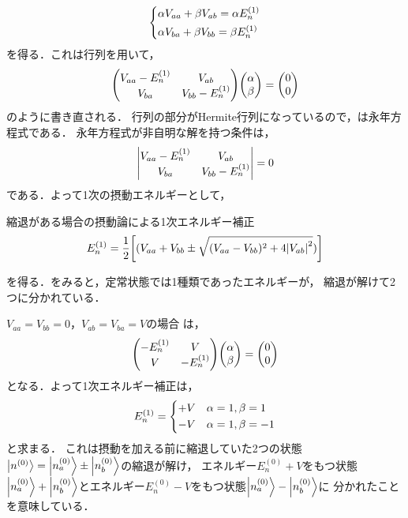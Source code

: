 \documentclass{report}
\begin{document}
  \begin{align}
    \begin{dcases}
      \alpha V_{aa} + \beta V_{ab} = \alpha E_n^{(1)}\\
      \alpha V_{ba} + \beta V_{bb} = \beta E_n^{(1)}
    \end{dcases}
  \end{align}
  を得る．これは行列を用いて，
  \begin{align}
    \mqty(
      V_{aa} - E_n^{(1)} & V_{ab} \\
      V_{ba} & V_{bb} - E_n^{(1)})
    \mqty(\alpha\\ \beta)
    =
    \mqty(0 \\ 0)\label{secular-eq}
  \end{align}
  のように書き直される．
  行列の部分がHermite行列になっているので，は永年方程式である．
  永年方程式が非自明な解を持つ条件は，
  \begin{align}
    \mqty|
      V_{aa} - E_n^{(1)} &  V_{ab}\\
      V_{ba} & V_{bb} - E_n^{(1)}|
    = 0
  \end{align}
  である．よって1次の摂動エネルギーとして，
  \begin{itembox}[l]{縮退がある場合の摂動論による1次エネルギー補正}
    \begin{align}
      E_n^{(1)} = \frac{1}{2}\qty[(V_{aa} + V_{bb}\pm\sqrt{(V_{aa} - V_{bb})^2 + 4\abs{V_{ab}}^2})]\label{1st-order-energy-with-degeneracy}
    \end{align}
  \end{itembox}
  を得る．をみると，定常状態では1種類であったエネルギーが，
  縮退が解けて2つに分かれている．
  \begin{myex}{}{}
    $ V_{aa} = V_{bb} = 0$，$ V_{ab} = V_{ba} = V$の場合
    は，
    \begin{align}
      \mqty(
        -E_n^{(1)} &  V\\
        V & -E_n^{(1)})
      \mqty(\alpha\\\beta)
      = \mqty(0\\ 0)
    \end{align}
    となる．よって1次エネルギー補正は，
    \begin{align}
      E_n^{(1)}=
      \begin{dcases}
        + V & \alpha = 1, \beta = 1\\
        - V & \alpha = 1, \beta = -1
      \end{dcases}
    \end{align}
    と求まる．
    これは摂動を加える前に縮退していた2つの状態$\ket{n^{(0)}} = \ket{n_a^{(0)}}\pm\ket{n_b^{(0)}}$の縮退が解け，
    エネルギー$E_n^{(0)} +  V$をもつ状態$\ket{n_a^{(0)}} + \ket{n_b^{(0)}}$とエネルギー$E_n^{(0)} -  V$をもつ状態$\ket{n_a^{(0)}} - \ket{n_b^{(0)}}$に
    分かれたことを意味している．
  \end{myex}
\end{document}
